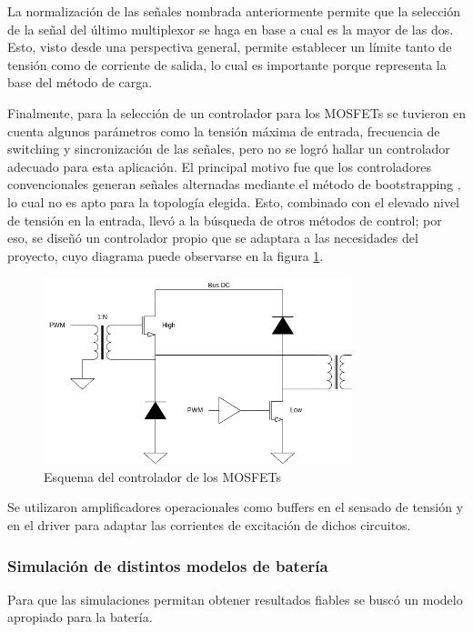 La normalización de las señales nombrada anteriormente permite que la selección de la señal del último multiplexor
se haga en base a cual es la mayor de las dos. Esto, visto desde una perspectiva general, permite establecer un límite
tanto de tensión como de corriente de salida, lo cual es importante porque representa la base del método de carga.

Finalmente, para la selección de un controlador para los MOSFETs se tuvieron en cuenta algunos parámetros como
la tensión máxima de entrada, frecuencia de switching y sincronización de las señales,
pero no se logró hallar un controlador adecuado para esta aplicación.
El principal motivo fue que los controladores convencionales generan señales alternadas mediante el método de bootstrapping \cite{hart},
lo cual no es apto para la topología elegida. Esto, combinado con el elevado nivel de tensión en la entrada,
llevó a la búsqueda de otros métodos de control; por eso, se diseñó un controlador propio que se adaptara
a las necesidades del proyecto, cuyo diagrama puede observarse en la figura \ref{fig:driver}.

\begin{figure}
    \centering
    \includegraphics[width=0.8\textwidth]{images/driver.png}
    \caption{Esquema del controlador de los MOSFETs}
    \label{fig:driver}
\end{figure}

Se utilizaron amplificadores operacionales como buffers en el sensado de tensión
y en el driver para adaptar las corrientes de excitación de dichos circuitos.

\subsubsection{Simulación de distintos modelos de batería}
Para que las simulaciones permitan obtener resultados fiables se buscó un modelo apropiado para la batería.

